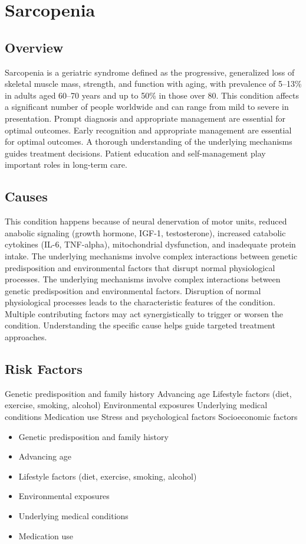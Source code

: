 \chapter{Sarcopenia}
\label{sec:Sarcopenia}

\section{Overview}
Sarcopenia is a geriatric syndrome defined as the progressive, generalized loss of skeletal muscle mass, strength, and function with aging, with prevalence of 5--13\% in adults aged 60--70 years and up to 50\% in those over 80. This condition affects a significant number of people worldwide and can range from mild to severe in presentation. Prompt diagnosis and appropriate management are essential for optimal outcomes. Early recognition and appropriate management are essential for optimal outcomes. A thorough understanding of the underlying mechanisms guides treatment decisions. Patient education and self-management play important roles in long-term care.
\section{Causes}
This condition happens because of neural denervation of motor units, reduced anabolic signaling (growth hormone, IGF-1, testosterone), increased catabolic cytokines (IL-6, TNF-alpha), mitochondrial dysfunction, and inadequate protein intake. The underlying mechanisms involve complex interactions between genetic predisposition and environmental factors that disrupt normal physiological processes. The underlying mechanisms involve complex interactions between genetic predisposition and environmental factors. Disruption of normal physiological processes leads to the characteristic features of the condition. Multiple contributing factors may act synergistically to trigger or worsen the condition. Understanding the specific cause helps guide targeted treatment approaches.
\section{Risk Factors}
Genetic predisposition and family history Advancing age Lifestyle factors (diet, exercise, smoking, alcohol) Environmental exposures Underlying medical conditions Medication use Stress and psychological factors Socioeconomic factors

\begin{itemize}[noitemsep]
  \item Genetic predisposition and family history
  \item Advancing age
  \item Lifestyle factors (diet, exercise, smoking, alcohol)
  \item Environmental exposures
  \item Underlying medical conditions
  \item Medication use
\end{itemize}
